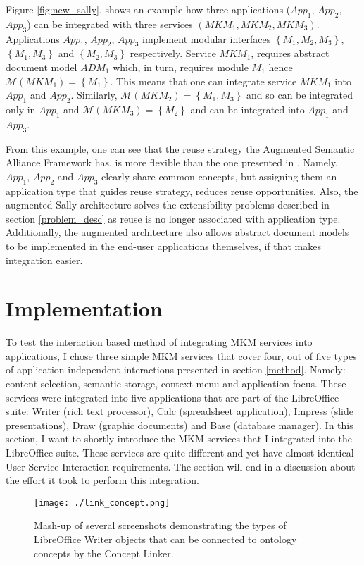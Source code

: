 \documentclass{llncs}
\begin{document}
Figure \ref{fig:new_sally}, shows an example how three applications ($App_1$, $App_2$, $App_3$) can be integrated with three services $(MKM_1, MKM_2, MKM_3)$. 
Applications $App_1$, $App_2$, $App_3$ implement modular interfaces $\left\{M_1, M_2, M_3\right\}$, $\left\{M_1, M_3\right\}$ and $\left\{M_2, M_3\right\}$ respectively. Service $MKM_1$, requires abstract document model $ADM_1$ which, in turn, requires module $M_1$ hence $\mathcal{M}(MKM_1)=\left\{M_1\right\}$. This means that one can integrate service $MKM_1$ into $App_1$ and $App_2$. Similarly, $\mathcal{M}(MKM_2)=\left\{M_1, M_3\right\}$ and so can be integrated only in $App_1$ and $\mathcal{M}(MKM_3)=\left\{M_2\right\}$ and can be integrated into $App_1$ and $App_3$.

From this example, one can see that the reuse strategy the Augmented Semantic Alliance Framework has, is more flexible than the one presented in \cite{DavJucKoh:safusa12}. Namely, $App_1$, $App_2$ and $App_3$ clearly share common concepts, but assigning them an application type that guides reuse strategy, reduces reuse opportunities. Also, the augmented Sally architecture solves the extensibility problems described in section \ref{problem_desc} as reuse is no longer associated with application type. Additionally, the augmented architecture also allows abstract document models to be implemented in the end-user applications themselves, if that makes integration easier. 

\section{Implementation}
\label{impl}
To test the interaction based method of integrating MKM services into applications, I chose three simple MKM services that cover four, out of five types of application independent interactions presented in section \ref{method}. Namely: content selection, semantic storage, context menu and application focus. These services were integrated into five applications that are part of the LibreOffice suite: Writer (rich text processor), Calc (spreadsheet application), Impress (slide presentations), Draw (graphic documents) and Base (database manager). In this section, I want to shortly introduce the MKM services that I integrated into the LibreOffice suite. These services are quite different and yet have almost identical User-Service Interaction requirements. The section will end in a discussion about the effort it took to perform this integration.

\begin{figure}
\centering
\texttt{[image: ./link\_concept.png]}
\caption{Mash-up of several screenshots demonstrating the types of LibreOffice Writer objects that can be connected to ontology concepts by the Concept Linker.}
\label{fig:concept_linker}
\end{figure}
\end{document}
